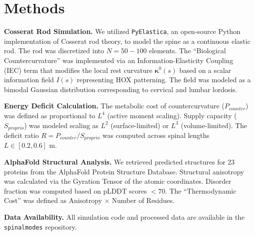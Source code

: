 \documentclass[11pt]{article}
\begin{document}


\section*{Methods}

\textbf{Cosserat Rod Simulation.} We utilized \texttt{PyElastica}\cite{pyelastica_zenodo}, an open-source Python implementation of Cosserat rod theory, to model the spine as a continuous elastic rod. The rod was discretized into $N=50-100$ elements. The ``Biological Countercurvature'' was implemented via an Information-Elasticity Coupling (IEC) term that modifies the local rest curvature $\bm{\kappa}^0(s)$ based on a scalar information field $I(s)$ representing HOX patterning. The field was modeled as a bimodal Gaussian distribution corresponding to cervical and lumbar lordosis.

\textbf{Energy Deficit Calculation.} The metabolic cost of countercurvature ($P_{counter}$) was defined as proportional to $L^4$ (active moment scaling). Supply capacity ($S_{proprio}$) was modeled scaling as $L^2$ (surface-limited) or $L^3$ (volume-limited). The deficit ratio $R = P_{counter} / S_{proprio}$ was computed across spinal lengths $L \in [0.2, 0.6]$ m.

\textbf{AlphaFold Structural Analysis.} We retrieved predicted structures for 23 proteins from the AlphaFold Protein Structure Database\cite{jumper2021alphafold}. Structural anisotropy was calculated via the Gyration Tensor of the atomic coordinates. Disorder fraction was computed based on pLDDT scores $< 70$. The ``Thermodynamic Cost'' was defined as Anisotropy $\times$ Number of Residues.

\textbf{Data Availability.} All simulation code and processed data are available in the \texttt{spinalmodes} repository.





\end{document}
